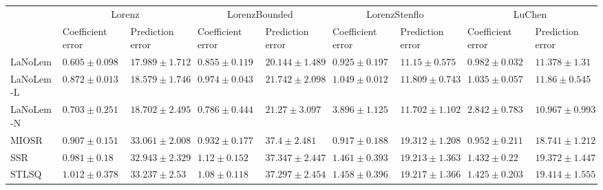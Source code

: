 \begin{table*}
{\begin{tabular}{lllllllll}
 & \multicolumn{2}{c}{Lorenz} & \multicolumn{2}{c}{LorenzBounded} & \multicolumn{2}{c}{LorenzStenflo} & \multicolumn{2}{c}{LuChen} \\
 & Coefficient error & Prediction error & Coefficient error & Prediction error & Coefficient error & Prediction error & Coefficient error & Prediction error \\
\midrule
LaNoLem & $\mathbf{0.605}\pm 0.098$ & $\mathbf{17.989}\pm 1.712$ & $0.855\pm 0.119$ & $\mathbf{20.144}\pm 1.489$ & $0.925\pm 0.197$ & $\mathbf{11.15}\pm 0.575$ & $0.982\pm 0.032$ & $11.378\pm 1.31$ \\
LaNoLem-L & $0.872\pm 0.013$ & $18.579\pm 1.746$ & $0.974\pm 0.043$ & $21.742\pm 2.098$ & $1.049\pm 0.012$ & $11.809\pm 0.743$ & $1.035\pm 0.057$ & $11.86\pm 0.545$ \\
LaNoLem-N & $0.703\pm 0.251$ & $18.702\pm 2.495$ & $\mathbf{0.786}\pm 0.444$ & $21.27\pm 3.097$ & $3.896\pm 1.125$ & $11.702\pm 1.102$ & $2.842\pm 0.783$ & $\mathbf{10.967}\pm 0.993$ \\
MIOSR & $0.907\pm 0.151$ & $33.061\pm 2.008$ & $0.932\pm 0.177$ & $37.4\pm 2.481$ & $\mathbf{0.917}\pm 0.188$ & $19.312\pm 1.208$ & $\mathbf{0.952}\pm 0.211$ & $18.741\pm 1.212$ \\
SSR & $0.981\pm 0.18$ & $32.943\pm 2.329$ & $1.12\pm 0.152$ & $37.347\pm 2.447$ & $1.461\pm 0.393$ & $19.213\pm 1.363$ & $1.432\pm 0.22$ & $19.372\pm 1.447$ \\
STLSQ & $1.012\pm 0.378$ & $33.237\pm 2.53$ & $1.08\pm 0.118$ & $37.297\pm 2.454$ & $1.458\pm 0.396$ & $19.217\pm 1.366$ & $1.425\pm 0.203$ & $19.414\pm 1.555$ \\

\midrule


\end{tabular}}
\end{table*}
